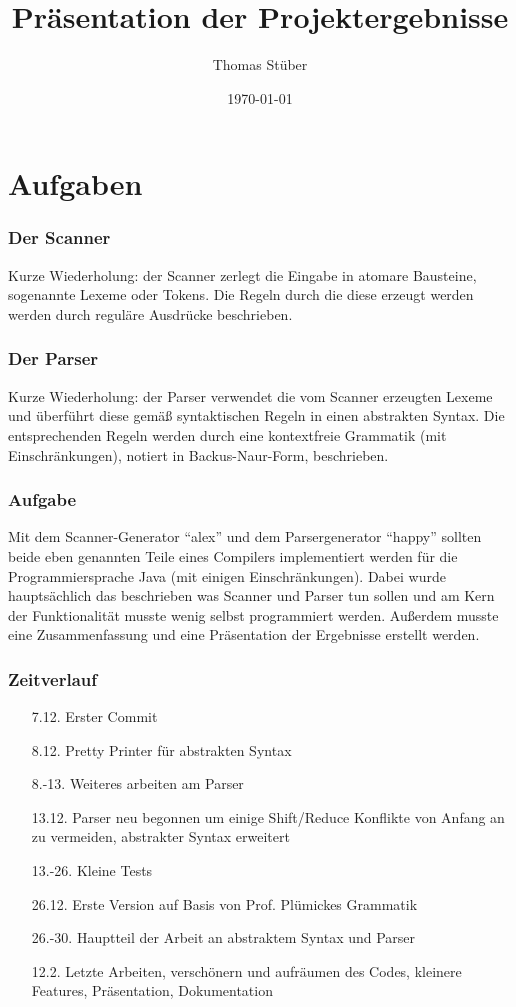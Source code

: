 \documentclass{beamer}
\title{Präsentation der Projektergebnisse}
\author{Thomas Stüber}
\date{\today}
\begin{document}
  \maketitle
  \section{Aufgaben}
  \frame{\tableofcontents[currentsection]}
  
  \begin{frame} %
    \frametitle{Der Scanner} %
    Kurze Wiederholung: der Scanner zerlegt die Eingabe in atomare Bausteine, sogenannte Lexeme oder Tokens. Die Regeln durch die diese erzeugt werden werden durch reguläre Ausdrücke beschrieben. 
  \end{frame}
  \begin{frame} %
    \frametitle{Der Parser} %
    Kurze Wiederholung: der Parser verwendet die vom Scanner erzeugten Lexeme und überführt diese gemäß syntaktischen Regeln in einen abstrakten Syntax. Die entsprechenden Regeln werden durch eine kontextfreie Grammatik (mit Einschränkungen), notiert in Backus-Naur-Form, beschrieben.
  \end{frame}
  \begin{frame} %
    \frametitle{Aufgabe} %
    Mit dem Scanner-Generator ``alex'' und dem Parsergenerator ``happy'' sollten beide eben genannten Teile eines Compilers implementiert werden für die Programmiersprache Java (mit einigen Einschränkungen). Dabei wurde hauptsächlich das beschrieben was Scanner und Parser tun sollen und am Kern der Funktionalität musste wenig selbst programmiert werden. Außerdem musste eine Zusammenfassung und eine Präsentation der Ergebnisse erstellt werden. 
  \end{frame}
  \begin{frame}
    \frametitle{Zeitverlauf}
    \begin{enumerate}
     \item[7.12.] Erster Commit
     \item[8.12.] Pretty Printer für abstrakten Syntax
     \item[8.-13.] Weiteres arbeiten am Parser
     \item[13.12.] Parser neu begonnen um einige Shift/Reduce Konflikte von Anfang an zu vermeiden, abstrakter Syntax erweitert
     \item[13.-26.] Kleine Tests
     \item[26.12.] Erste Version auf Basis von Prof. Plümickes Grammatik
     \item[26.-30.] Hauptteil der Arbeit an abstraktem Syntax und Parser
     \item[12.2.] Letzte Arbeiten, verschönern und aufräumen des Codes, kleinere Features, Präsentation, Dokumentation
    \end{enumerate}

  \end{frame}
\end{document}

